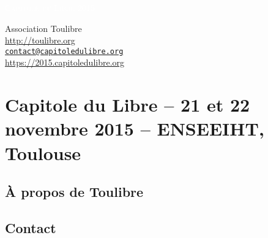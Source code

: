 \documentclass{cdl_sponsor}
\begin{document}
\thispagestyle{empty} %



\parbox[t]{1.0\textwidth}{
	\flushright \fontsize{44pt}{56pt}\selectfont %

	\textcolor{white}{
		\hfill \textsc{Capitole du Libre 2015} \\
		\fontsize{36pt}{48pt}\selectfont{
      \hfill 21 et 22 novembre 2015 \\
    }
		\fontsize{24pt}{36pt}
	}
	\par

}




	

\vfill %

{\centering \large
\hfill Association Toulibre \\
\hfill \url{http://toulibre.org} \\
\hfill \href{mailto:contact@capitoledulibre.org}{\texttt{contact@capitoledulibre.org}} \\
\hfill \url{https://2015.capitoledulibre.org} \\
}


\section{Capitole du Libre {\small -- 21 et 22 novembre 2015 -- ENSEEIHT, Toulouse}}

	

\subsection{À propos de Toulibre}

  

\subsection{Contact}

	
\end{document}
